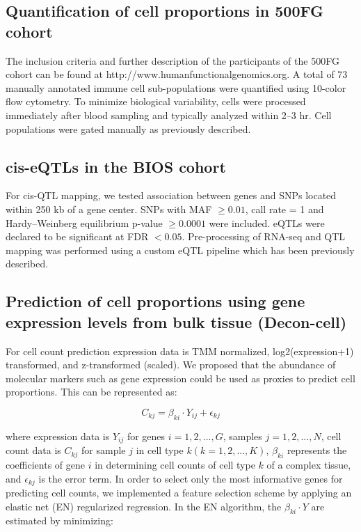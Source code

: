 \subsection{Quantification of cell proportions in 500FG cohort}
The inclusion criteria and further description of the participants of the 500FG cohort can be found at http://www.humanfunctionalgenomics.org. A total of 73 manually annotated immune cell sub-populations were quantified using 10-color flow cytometry. To minimize biological variability, cells were processed immediately after blood sampling and typically analyzed within 2–3 hr. Cell populations were gated manually as previously described\cite{aguirre-gamboaDifferentialEffectsEnvironmental2016}.

\subsection{cis-eQTLs in the BIOS cohort}
For cis-QTL mapping, we tested association between genes and SNPs located within 250 kb of a gene center. SNPs with MAF $\geq 0.01$, call rate = 1 and Hardy–Weinberg equilibrium p-value $\geq 0.0001$ were included. eQTLs were declared to be significant at FDR $< 0.05$. Pre-processing of RNA-seq and QTL mapping was performed using a custom eQTL pipeline which has been previously described\cite{zhernakovaIdentificationContextdependentExpression2017}.

\subsection{Prediction of cell proportions using gene expression levels from bulk tissue (Decon-cell)}
For cell count prediction expression data is TMM normalized, log2(expression+1) transformed, and z-transformed (scaled). We proposed that the abundance of molecular markers such as gene expression could be used as proxies to predict cell proportions. This can be represented as:

\begin{equation}
C_{kj} = \beta_{ki} \cdot Y_{ij} + \epsilon_{kj}
\end{equation}

where expression data is $Y_{ij}$ for genes $i = 1, 2,..., G$, samples $j = 1, 2, ..., N$, cell count data is $C_{kj}$ for sample $j$ in cell type $k (k = 1, 2, ..., K)$, $\beta_{ki}$ represents the coefficients of gene $i$ in determining cell counts of cell type $k$ of a complex tissue, and $\epsilon_{kj}$ is the error term.
In order to select only the most informative genes for predicting cell counts, we implemented a feature selection scheme by applying an elastic net (EN) regularized regression. In the EN algorithm, the $\beta_{ki} \cdot Y$ are estimated by minimizing:

